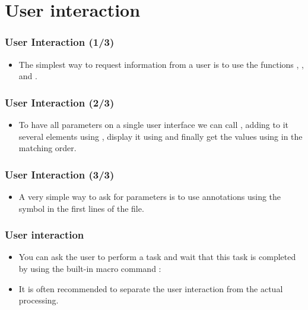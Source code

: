 \section{User interaction}
\begin{frame}[fragile]
  \frametitle<presentation>{User Interaction (1/3)}
  \begin{itemize}
  \item The simplest way to request information from a user is to use
    the functions , ,
     and .\par
    
  \end{itemize}
\end{frame}

\begin{frame}[fragile]
  \frametitle<presentation>{User Interaction (2/3)}
  \begin{itemize}
  \item To have all parameters on a single user interface we can
    call , adding to it several elements
    using , display it using
     and finally get the values using
     in the matching order.\par
    
  \end{itemize}
\end{frame}

\begin{frame}[fragile]
  \frametitle<presentation>{User Interaction (3/3)}
  \begin{itemize}
  \item A very simple way to ask for parameters is to use annotations
    using the  symbol in the first lines of the file.\par
    

  \end{itemize}
\end{frame}

\begin{frame}[fragile]
  \frametitle<presentation>{User interaction}
  \begin{itemize}
  \item You can ask the user to perform a task and wait that this task is
    completed by using the built-in macro command :
    
  \item It is often recommended to separate the user interaction from
    the actual processing.
  \end{itemize}
\end{frame}

